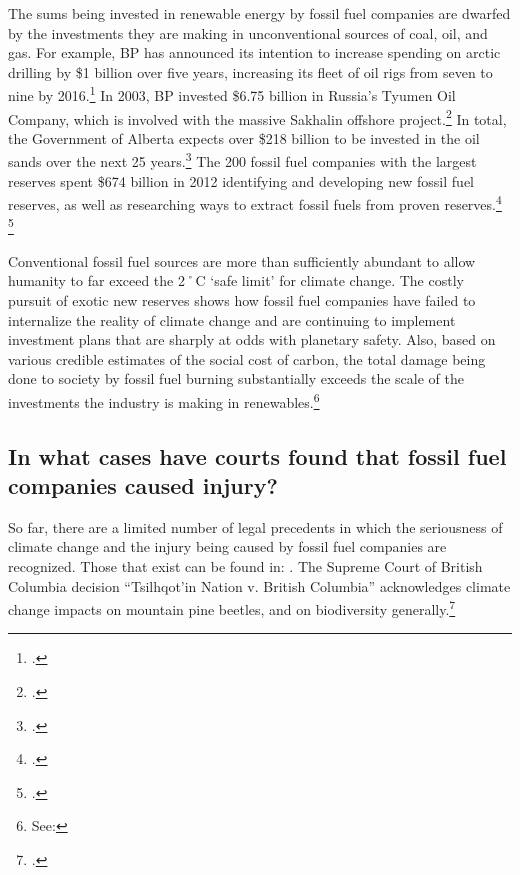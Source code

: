 The sums being invested in renewable energy by fossil fuel companies are dwarfed by the investments they are making in unconventional sources of coal, oil, and gas.
For example, BP has announced its intention to increase spending on arctic drilling by \$1 billion over five years, increasing its fleet of oil rigs from seven to nine by 2016.\footcite[][]{BPArcticBillion}
In 2003, BP invested \$6.75 billion in Russia's Tyumen Oil Company, which is involved with the massive Sakhalin offshore project.\footcite[][]{NotBeyondInRussia}
In total, the Government of Alberta expects over \$218 billion to be invested in the oil sands over the next 25 years.\footcite[][]{OilSandsEconBenef}
The 200 fossil fuel companies with the largest reserves spent \$674 billion in 2012 identifying and developing new fossil fuel reserves, as well as researching ways to extract fossil fuels from proven reserves.\footcite[][p. 4]{CTI2012} \footcite[See also: ][]{SteinerFinancialSector}



Conventional fossil fuel sources are more than sufficiently abundant to allow humanity to far exceed the 2˚C `safe limit' for climate change.
The costly pursuit of exotic new reserves shows how fossil fuel companies have failed to internalize the reality of climate change and are continuing to implement investment plans that are sharply at odds with planetary safety.
Also, based on various credible estimates of the social cost of carbon, the total damage being done to society by fossil fuel burning substantially exceeds the scale of the investments the industry is making in renewables.\footnote{See: }

	
	
	\subsection{In what cases have courts found that fossil fuel companies caused injury?}
	\label{LegalPrecedents}
	
	
	
So far, there are a limited number of legal precedents in which the seriousness of climate change and the injury being caused by fossil fuel companies are recognized.
Those that exist can be found in: .
The Supreme Court of British Columbia decision ``Tsilhqot'in Nation v. British Columbia'' acknowledges climate change impacts on mountain pine beetles, and on biodiversity generally.\footcite[][p. 358, 406]{Tsilhqotin}


